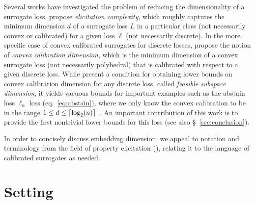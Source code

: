 \documentclass[anon]{colt2020} %
\newcommand{\ellabs}[1]{\ell_{#1}}
\DeclarePairedDelimiter\ceil{\lceil}{\rceil}
\begin{document}
Several works have investigated the problem of reducing the dimensionality of a surrogate loss.
\cite{frongillo2015elicitation} propose \emph{elicitation complexity}, which roughly captures the minimum dimension $d$ of a surrogate loss $L$ in a particular class (not necessarily convex or calibrated) for a given loss $\ell$ (not necessarily discrete).
In the more specific case of convex calibrated surrogates for discrete losses, \cite{ramaswamy2016convex} propose the notion of \emph{convex calibration dimension}, which is the minimum dimension of a convex surrogate loss (not necessarily polyhedral) that is calibrated with respect to a given discrete loss.
While \cite{ramaswamy2016convex} present a condition for obtaining lower bounds on convex calibration dimension for any discrete loss, called \emph{feasible subspace dimension}, it yields vacuous bounds for important examples such as the abstain loss $\ellabs{\alpha}$ loss (eq.~\eqref{eq:abstain}), where we only know the convex calibration to be in the range $1\leq d\leq \ceil{\log_2(n)}$~\citep{ramaswamy2018consistent}.
An important contribution of this work is to provide the first nontrivial lower bounds for this loss (see also \S~\ref{sec:conclusion}).


In order to concisely discuss embedding dimension, we appeal to notation and terminology from the field of property elicitation (\cite{savage1971elicitation, osband1985information-eliciting, gneiting2007strictly, lambert2009eliciting, lambert2018elicitation}), relating it to the language of calibrated surrogates as needed.

\section{Setting}
\end{document}
